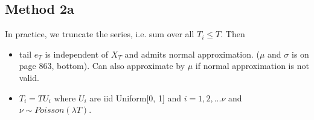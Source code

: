 \documentclass[11pt, oneside]{article}
\begin{document}
\subsection{Method 2a}
In practice, we truncate the series, i.e. sum over all $T_i\leq T$.  Then 
\begin{itemize}
\item tail $e_T$ is independent of $X_T$ and admits normal approximation. ($\mu$ and $\sigma$ is on page 863, bottom). Can also approximate by $\mu$ if normal approximation is not valid.

\item $T_i = TU_i$ where $U_i$ are iid Uniform[0, 1] and $i = 1, 2, ...\nu$ and $\nu \sim Poisson(\lambda T)$.
\end{itemize}
\end{document}
